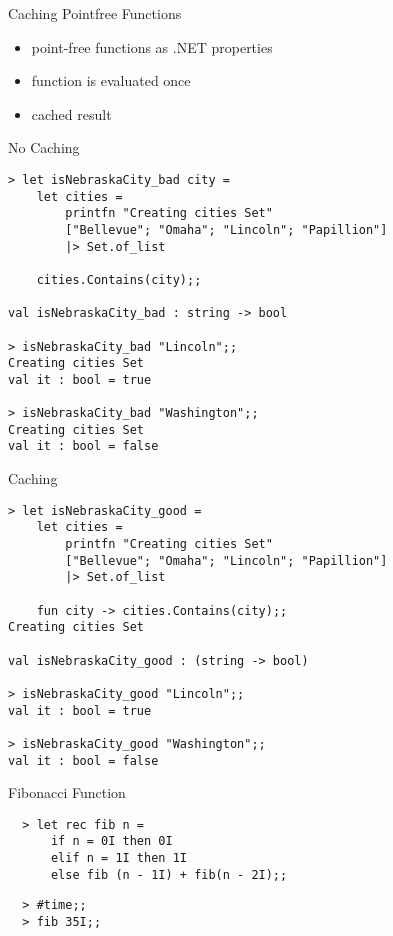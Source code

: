 \documentclass{beamer}
\begin{document}
\begin{frame}{Caching Pointfree Functions}
  \begin{itemize}[<+->]
    \item point-free functions as .NET properties
    \item function is evaluated once
    \item cached result
  \end{itemize}
\end{frame}

\begin{frame}[fragile]{No Caching}
\small
\begin{verbatim}
> let isNebraskaCity_bad city =
    let cities =
        printfn "Creating cities Set"
        ["Bellevue"; "Omaha"; "Lincoln"; "Papillion"]
        |> Set.of_list

    cities.Contains(city);;

val isNebraskaCity_bad : string -> bool

> isNebraskaCity_bad "Lincoln";;
Creating cities Set
val it : bool = true

> isNebraskaCity_bad "Washington";;
Creating cities Set
val it : bool = false
\end{verbatim}
\end{frame}

\begin{frame}[fragile]{Caching}
\small
\begin{verbatim}
> let isNebraskaCity_good =
    let cities =
        printfn "Creating cities Set"
        ["Bellevue"; "Omaha"; "Lincoln"; "Papillion"]
        |> Set.of_list

    fun city -> cities.Contains(city);;
Creating cities Set

val isNebraskaCity_good : (string -> bool)

> isNebraskaCity_good "Lincoln";;
val it : bool = true

> isNebraskaCity_good "Washington";;
val it : bool = false
\end{verbatim}
\end{frame}

\begin{frame}[fragile]{Fibonacci Function}
  \begin{verbatim}
  > let rec fib n =
      if n = 0I then 0I
      elif n = 1I then 1I
      else fib (n - 1I) + fib(n - 2I);;
  \end{verbatim}
  \begin{verbatim}
  > #time;;
  > fib 35I;;
  \end{verbatim}
\end{frame}
\end{document}
